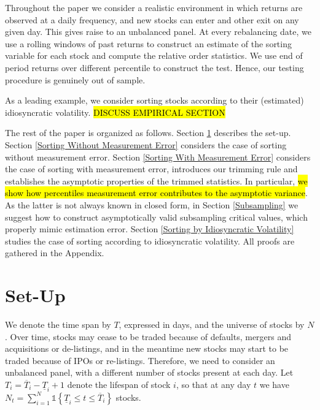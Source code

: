 Throughout the paper we consider a realistic environment in which returns are observed at a daily frequency, and new stocks can enter and other exit on any given day. This gives raise to an unbalanced panel. At every rebalancing date, we use a rolling windows of past returns to construct an estimate of the sorting variable for each stock and compute the relative order statistics. We use end of period returns over different percentile to construct the test. Hence, our testing procedure is genuinely out of sample.

As a leading example, we consider sorting stocks according to their (estimated) idiosyncratic volatility. \hl{DISCUSS EMPIRICAL SECTION}

The rest of the paper is organized as follows. Section \ref{Set-Up} describes the set-up. Section \ref{Sorting Without Measurement Error} considers the case of sorting without measurement error. Section \ref{Sorting With Measurement Error} considers the case of sorting with measurement error, introduces our trimming rule and establishes the asymptotic properties of the trimmed statistics. In particular, \hl{we show how percentiles measurement error contributes to the asymptotic variance}. As the latter is not always known in closed form, in Section \ref{Subsampling} we suggest how to construct asymptotically valid subsampling critical values, which properly mimic estimation error. Section \ref{Sorting by Idiosyncratic Volatility} studies the case of sorting according to idiosyncratic volatility. All proofs are gathered in the Appendix.



\section{Set-Up}
\label{Set-Up}

We denote the time span by $T$, expressed in days, and the universe of stocks by $N$. Over time, stocks may cease to be traded because of defaults, mergers and acquisitions or de-listings, and in the meantime new stocks may start to be traded because of IPOs or re-listings. Therefore, we need to consider an unbalanced panel, with a different number of stocks present at each day. Let $T_{i}=\overline{T}_{i}-\underline{T}_{i}+1$ denote the lifespan of stock $i$, so that at any day $t$ we have $N_t=\sum_{i=1}^{N} \mathds{1} \left\{ \underline{T}_{i}\leq t\leq \overline{T}_{i}\right\} $ stocks. 

